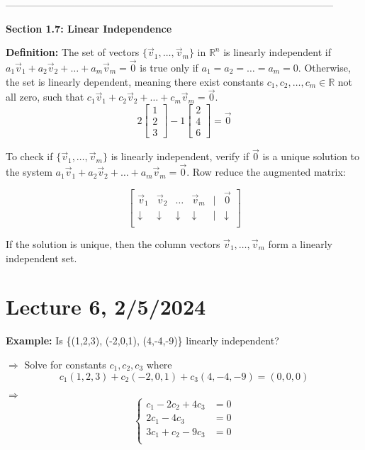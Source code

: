 \documentclass{article}
\begin{document}
---------------------------------------------------------------------------------------------------

\textbf{Section 1.7: Linear Independence}

\textbf{Definition:} The set of vectors \(\{\vec{v}_1, \ldots, \vec{v}_m\}\) in \(\mathbb{R}^n\) is linearly independent if \(a_1\vec{v}_1 + a_2\vec{v}_2 + \ldots + a_m\vec{v}_m = \vec{0}\) is true only if \(a_1 = a_2 = \ldots = a_m = 0\). Otherwise, the set is linearly dependent, meaning there exist constants \(c_1, c_2, \ldots, c_m \in \mathbb{R}\) not all zero, such that \(c_1\vec{v}_1 + c_2\vec{v}_2 + \ldots + c_m\vec{v}_m = \vec{0}\).
\[
2\begin{bmatrix}
    1 \\
    2 \\
    3
\end{bmatrix}
-1
\begin{bmatrix}
    2 \\
    4 \\
    6  
\end{bmatrix}
= \vec{0}
\]

To check if \(\{\vec{v}_1, \ldots, \vec{v}_m\}\) is linearly independent, verify if \(\vec{0}\) is a unique solution to the system \(a_1\vec{v}_1 + a_2\vec{v}_2 + \ldots + a_m\vec{v}_m = \vec{0}\). Row reduce the augmented matrix:

\[
\begin{bmatrix}
    \vec{v}_1 & \vec{v}_2 & \ldots & \vec{v}_m & | & \vec{0} \\
    \downarrow &  \downarrow &  \downarrow &  \downarrow & | & \downarrow \\
\end{bmatrix}
\]

If the solution is unique, then the column vectors \(\vec{v}_1, \ldots, \vec{v}_m\) form a linearly independent set.


\section{Lecture 6, 2/5/2024}


\textbf{Example:} Is \{(1,2,3), (-2,0,1), (4,-4,-9)\} linearly independent?

$\Rightarrow$ Solve for constants \(c_1, c_2, c_3\) where
\[c_1(1,2,3) + c_2(-2,0,1) + c_3(4,-4,-9) = (0,0,0)\]

$\Rightarrow$
\[
\begin{cases}
    c_1 - 2c_2 + 4c_3 &= 0 \\
    2c_1 - 4c_3 &= 0 \\
    3c_1 + c_2 - 9c_3 &= 0 \\
\end{cases}
\]
\end{document}

